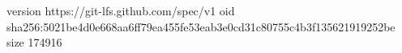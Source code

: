 version https://git-lfs.github.com/spec/v1
oid sha256:5021be4d0e668aa6ff79ea455fe53eab3e0cd31c80755c4b3f135621919252be
size 174916
